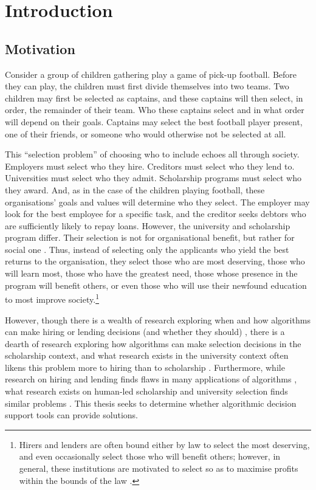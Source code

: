 \chapter{\label{ch:intro}Introduction} 

\minitoc

\section{Motivation}

Consider a group of children gathering play a game of pick-up football. Before they can play, the children must first divide themselves into two teams. Two children may first be selected as captains, and these captains will then select, in order, the remainder of their team. Who these captains select and in what order will depend on their goals. Captains may select the best football player present, one of their friends, or someone who would otherwise not be selected at all.

This ``selection problem'' of choosing who to include echoes all through society. Employers must select who they hire. Creditors must select who they lend to. Universities must select who they admit. Scholarship programs must select who they award. And, as in the case of the children playing football, these organisations' goals and values will determine who they select. The employer may look for the best employee for a specific task, and the creditor seeks debtors who are sufficiently likely to repay loans. However, the university and scholarship program differ. Their selection is not for organisational benefit, but rather for social one \cite{Warikoo_2019}. Thus, instead of selecting only the applicants who yield the best returns to the organisation, they select those who are most deserving, those who will learn most, those who have the greatest need, those whose presence in the program will benefit others, or even those who will use their newfound education to most improve society.\footnote{Hirers and lenders are often bound either by law to select the most deserving, and even occasionally select those who will benefit others; however, in general, these institutions are motivated to select so as to maximise profits within the bounds of the law \cite{schmidt1998validity}.}

However, though there is a wealth of research exploring when and how algorithms can make hiring or lending decisions (and whether they should) \cite{schmidt1998validity,schumann2017diverse,raghavan2020mitigating,horodyski_applicants_2023,Leung_Zhang_Jibuti_Zhao_Klein_Pierce_Robert_Zhu_2020}, there is a dearth of research exploring how algorithms can make selection decisions in the scholarship context, and what research exists in the university context often likens this problem more to hiring than to scholarship \cite{schumann2017diverse}. Furthermore, while research on hiring and lending finds flaws in many applications of algorithms \cite{raghavan2020mitigating,horodyski_applicants_2023}, what research exists on human-led scholarship and university selection finds similar problems \cite{Peng_Nushi_Kıcıman_Inkpen_Suri_Kamar_2019}. This thesis seeks to determine whether algorithmic decision support tools can provide solutions.

